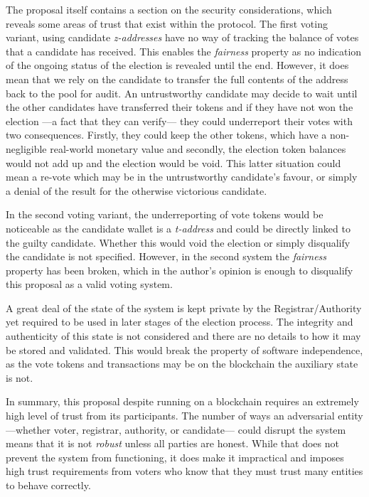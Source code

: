 The proposal itself contains a section on the security considerations, which reveals some areas of trust that exist within the protocol. The first voting variant, using candidate \emph{z-addresses} have no way of tracking the balance of votes that a candidate has received. This enables the \emph{fairness} property as no indication of the ongoing status of the election is revealed until the end. However, it does mean that we rely on the candidate to transfer the full contents of the address back to the pool for audit. An untrustworthy candidate may decide to wait until the other candidates have transferred their tokens and if they have not won the election ---a fact that they can verify--- they could underreport their votes with two consequences. Firstly, they could keep the other tokens, which have a non-negligible real-world monetary value and secondly, the election token balances would not add up and the election would be void. This latter situation could mean a re-vote which may be in the untrustworthy candidate's favour, or simply a denial of the result for the otherwise victorious candidate.

In the second voting variant, the underreporting of vote tokens would be noticeable as the candidate wallet is a \emph{t-address} and could be directly linked to the guilty candidate. Whether this would void the election or simply disqualify the candidate is not specified. However, in the second system the \emph{fairness} property has been broken, which in the author's opinion is enough to disqualify this proposal as a valid voting system.

A great deal of the state of the system is kept private by the Registrar/Authority yet required to be used in later stages of the election process. The integrity and authenticity of this state is not considered and there are no details to how it may be stored and validated. This would break the property of software independence, as the vote tokens and transactions may be on the blockchain the auxiliary state is not.

In summary, this proposal despite running on a blockchain requires an extremely high level of trust from its participants. The number of ways an adversarial entity ---whether voter, registrar, authority, or candidate--- could disrupt the system means that it is not \emph{robust} unless all parties are honest. While that does not prevent the system from functioning, it does make it impractical and imposes high trust requirements from voters who know that they must trust many entities to behave correctly.

